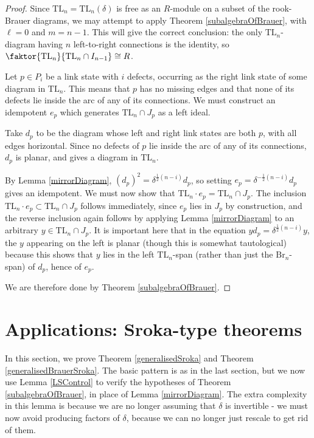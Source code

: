 \documentclass[12pt]{amsart}
\theoremstyle{plain}
\theoremstyle{definition} \newtheorem{definition}[theorem]{Definition}
\theoremstyle{plain}
\theoremstyle{plain} \newtheorem{proposition}[theorem]{Proposition}
\theoremstyle{plain} \newtheorem{conjecture}[theorem]{Conjecture}
\theoremstyle{plain} \newtheorem{corollary}[theorem]{Corollary}
\theoremstyle{remark} \newtheorem{claim}[theorem]{Claim}
\theoremstyle{remark} \newtheorem{remark}[theorem]{Remark}
\theoremstyle{remark} \newtheorem{example}[theorem]{Example}
\theoremstyle{remark} \newtheorem{comment}[theorem]{Comment}
\theoremstyle{definition} \newtheorem{question}[theorem]{Question}
\newcommand{\Brauer}{\mathrm{Br}}
\newcommand{\TL}{\mathrm{TL}}
\begin{document}
\begin{proof} Since $\TL_n = \TL_n(\delta)$ is free as an $R$-module on a subset of the rook-Brauer diagrams, we may attempt to apply Theorem \ref{subalgebraOfBrauer}, with $\ell = 0$ and $m = n-1$. This will give the correct conclusion: the only $\TL_n$-diagram having $n$ left-to-right connections is the identity, so $\faktor{\TL_n}{\TL_n \cap I_{n-1}} \cong R$.

Let $p \in P_i$ be a link state with $i$ defects, occurring as the right link state of some diagram in $\TL_n$. This means that $p$ has no missing edges and that none of its defects lie inside the arc of any of its connections. We must construct an idempotent $e_p $ which generates $\TL_n \cap J_p$ as a left ideal.

Take $d_p$ to be the diagram whose left and right link states are both $p$, with all edges horizontal. Since no defects of $p$ lie inside the arc of any of its connections, $d_p$ is planar, and gives a diagram in $\TL_n$.

By Lemma \ref{mirrorDiagram}, $(d_p)^2 = \delta^{\frac{1}{2}(n-i)} d_p$, so setting $e_p = \delta^{-\frac{1}{2}(n-i)} d_p$ gives an idempotent. We must now show that $\TL_n \cdot e_p = \TL_n \cap J_p$. The inclusion $\TL_n \cdot e_p \subset \TL_n \cap J_p$ follows immediately, since $e_p$ lies in $J_p$ by construction, and the reverse inclusion again follows by applying Lemma \ref{mirrorDiagram} to an arbitrary $y \in \TL_n \cap J_p$. It is important here that in the equation $y d_p = \delta^{\frac{1}{2}(n-i)} y$, the $y$ appearing on the left is planar (though this is somewhat tautological) because this shows that $y$ lies in the left $\TL_n$-span (rather than just the $\Brauer_n$-span) of $d_p$, hence of $e_p$.

We are therefore done by Theorem \ref{subalgebraOfBrauer}. \end{proof}

\section{Applications: Sroka-type theorems} \label{applicationsSroka}

In this section, we prove Theorem \ref{generalisedSroka} and Theorem \ref{generalisedBrauerSroka}. The basic pattern is as in the last section, but we now use Lemma \ref{LSControl} to verify the hypotheses of Theorem \ref{subalgebraOfBrauer}, in place of Lemma \ref{mirrorDiagram}. The extra complexity in this lemma is because we are no longer assuming that $\delta$ is invertible - we must now avoid producing factors of $\delta$, because we can no longer just rescale to get rid of them.
\end{document}
